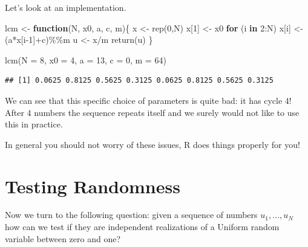 \documentclass[
]{book}
\newenvironment{Shaded}{\begin{snugshade}}{\end{snugshade}}
\newcommand{\AttributeTok}[1]{\textcolor[rgb]{0.77,0.63,0.00}{#1}}
\newcommand{\ControlFlowTok}[1]{\textcolor[rgb]{0.13,0.29,0.53}{\textbf{#1}}}
\newcommand{\DecValTok}[1]{\textcolor[rgb]{0.00,0.00,0.81}{#1}}
\newcommand{\FunctionTok}[1]{\textcolor[rgb]{0.00,0.00,0.00}{#1}}
\newcommand{\NormalTok}[1]{#1}
\newcommand{\OtherTok}[1]{\textcolor[rgb]{0.56,0.35,0.01}{#1}}
\newcommand{\SpecialCharTok}[1]{\textcolor[rgb]{0.00,0.00,0.00}{#1}}
\theoremstyle{definition}
\theoremstyle{definition}
\theoremstyle{definition}
\theoremstyle{definition}
\theoremstyle{remark}
\begin{document}
Let's look at an implementation.

\begin{Shaded}
\begin{Highlighting}[]
\NormalTok{lcm }\OtherTok{\textless{}{-}} \ControlFlowTok{function}\NormalTok{(N, x0, a, c, m)\{}
\NormalTok{   x }\OtherTok{\textless{}{-}} \FunctionTok{rep}\NormalTok{(}\DecValTok{0}\NormalTok{,N)}
\NormalTok{   x[}\DecValTok{1}\NormalTok{] }\OtherTok{\textless{}{-}}\NormalTok{ x0}
   \ControlFlowTok{for}\NormalTok{ (i }\ControlFlowTok{in} \DecValTok{2}\SpecialCharTok{:}\NormalTok{N) x[i] }\OtherTok{\textless{}{-}}\NormalTok{ (a}\SpecialCharTok{*}\NormalTok{x[i}\DecValTok{{-}1}\NormalTok{]}\SpecialCharTok{+}\NormalTok{c)}\SpecialCharTok{\%\%}\NormalTok{m}
\NormalTok{   u }\OtherTok{\textless{}{-}}\NormalTok{ x}\SpecialCharTok{/}\NormalTok{m}
   \FunctionTok{return}\NormalTok{(u)}
\NormalTok{\}}
\end{Highlighting}
\end{Shaded}

\begin{Shaded}
\begin{Highlighting}[]
\FunctionTok{lcm}\NormalTok{(}\AttributeTok{N =} \DecValTok{8}\NormalTok{, }\AttributeTok{x0 =} \DecValTok{4}\NormalTok{, }\AttributeTok{a =} \DecValTok{13}\NormalTok{, }\AttributeTok{c =} \DecValTok{0}\NormalTok{, }\AttributeTok{m =} \DecValTok{64}\NormalTok{)}
\end{Highlighting}
\end{Shaded}

\begin{verbatim}
## [1] 0.0625 0.8125 0.5625 0.3125 0.0625 0.8125 0.5625 0.3125
\end{verbatim}

We can see that this specific choice of parameters is quite bad: it has cycle 4! After 4 numbers the sequence repeats itself and we surely would not like to use this in practice.

In general you should not worry of these issues, R does things properly for you!

\hypertarget{testing-randomness}{%
\section{Testing Randomness}\label{testing-randomness}}

Now we turn to the following question: given a sequence of numbers \(u_1,\dots,u_N\) how can we test if they are independent realizations of a Uniform random variable between zero and one?
\end{document}
